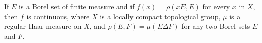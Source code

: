 If $E$ is a Borel set of finite measure and if $f(x) = \rho(xE,E)$ for every $x$ in $X$, then $f$ is continuous, where $X$ is a locally compact topological group, $\mu$ is a regular Haar measure on $X$, and $\rho(E,F) = \mu(E \Delta F)$ for any two Borel sets $E$ and $F$.
